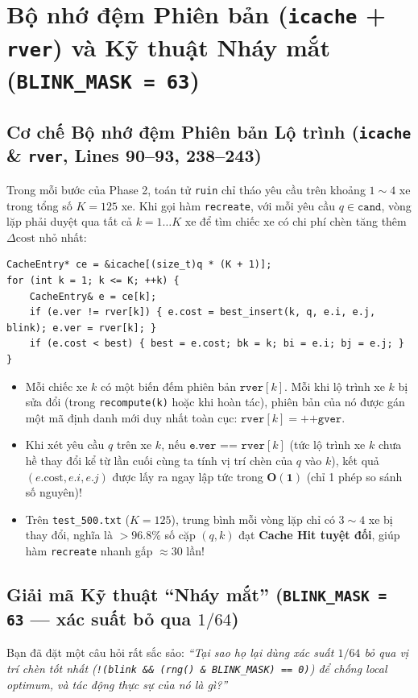 \documentclass[11pt,a4paper]{article}
\theoremstyle{definition}
\begin{document}
\section{Bộ nhớ đệm Phiên bản (\texttt{icache} + \texttt{rver}) và Kỹ thuật Nháy mắt (\texttt{BLINK\_MASK = 63})}

\subsection{Cơ chế Bộ nhớ đệm Phiên bản Lộ trình (\texttt{icache} \& \texttt{rver}, Lines 90--93, 238--243)}
Trong mỗi bước của Phase 2, toán tử \texttt{ruin} chỉ tháo yêu cầu trên khoảng $1\sim 4$ xe trong tổng số $K = 125$ xe. Khi gọi hàm \texttt{recreate}, với mỗi yêu cầu $q \in \texttt{cand}$, vòng lặp phải duyệt qua tất cả $k = 1 \dots K$ xe để tìm chiếc xe có chi phí chèn tăng thêm $\Delta \text{cost}$ nhỏ nhất:
\begin{lstlisting}
CacheEntry* ce = &icache[(size_t)q * (K + 1)];
for (int k = 1; k <= K; ++k) {
    CacheEntry& e = ce[k];
    if (e.ver != rver[k]) { e.cost = best_insert(k, q, e.i, e.j, blink); e.ver = rver[k]; }
    if (e.cost < best) { best = e.cost; bk = k; bi = e.i; bj = e.j; }
}
\end{lstlisting}
\begin{itemize}[leftmargin=1.5em]
    \item Mỗi chiếc xe $k$ có một biến đếm phiên bản $\texttt{rver}[k]$. Mỗi khi lộ trình xe $k$ bị sửa đổi (trong \texttt{recompute(k)} hoặc khi hoàn tác), phiên bản của nó được gán một mã định danh mới duy nhất toàn cục: $\texttt{rver}[k] = \texttt{++gver}$.
    \item Khi xét yêu cầu $q$ trên xe $k$, nếu $\texttt{e.ver == rver}[k]$ (tức lộ trình xe $k$ chưa hề thay đổi kể từ lần cuối cùng ta tính vị trí chèn của $q$ vào $k$), kết quả $(e.\text{cost}, e.i, e.j)$ được lấy ra ngay lập tức trong $\mathbf{O(1)}$ (chỉ 1 phép so sánh số nguyên)!
    \item Trên \texttt{test\_500.txt} ($K = 125$), trung bình mỗi vòng lặp chỉ có $3\sim 4$ xe bị thay đổi, nghĩa là $\mathbf{>96.8\%}$ số cặp $(q, k)$ đạt \textbf{Cache Hit tuyệt đối}, giúp hàm \texttt{recreate} nhanh gấp $\approx 30$ lần!
\end{itemize}

\subsection{Giải mã Kỹ thuật ``Nháy mắt'' (\texttt{BLINK\_MASK = 63} --- xác suất bỏ qua $1/64$)}
Bạn đã đặt một câu hỏi rất sắc sảo: \textit{``Tại sao họ lại dùng xác suất $1/64$ bỏ qua vị trí chèn tốt nhất (\texttt{!(blink \&\& (rng() \& BLINK\_MASK) == 0)}) để chống local optimum, và tác động thực sự của nó là gì?''}
\end{document}

